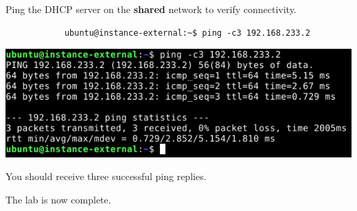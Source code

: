 \documentclass[letterpaper, 12pt]{article}
\begin{document}
\begin{enumerate}
    \begin{labstep}
        Ping the DHCP server on the \textbf{shared} network to verify connectivity.
        \begin{lstlisting}
            ubuntu@instance-external:~$ ping -c3 192.168.233.2
        \end{lstlisting}

        \begin{center}
            \includegraphics[width=\linewidth]{images/part6/step11.png}
        \end{center}
    \end{labstep}

    \begin{notebox}
        You should receive three successful ping replies.
    \end{notebox}

    \begin{labstep}
        The lab is now complete.
    \end{labstep}

\end{enumerate}
\end{document}

